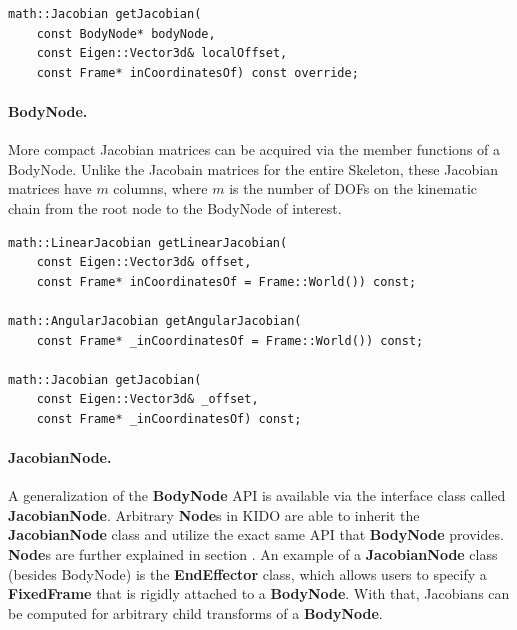 \begin{lstlisting}[caption=Skeleton.h]
math::Jacobian getJacobian(
    const BodyNode* bodyNode, 
    const Eigen::Vector3d& localOffset, 
    const Frame* inCoordinatesOf) const override;
\end{lstlisting}






\paragraph{BodyNode.} More compact Jacobian matrices can be acquired
via the member functions of a BodyNode. Unlike the Jacobain matrices
for the entire Skeleton, these Jacobian matrices have $m$ columns, where $m$ is the number of DOFs on the kinematic chain from the root node to the BodyNode of interest.


\begin{lstlisting}[caption=BodyNode.h]
math::LinearJacobian getLinearJacobian(
    const Eigen::Vector3d& offset, 
    const Frame* inCoordinatesOf = Frame::World()) const;

math::AngularJacobian getAngularJacobian(
    const Frame* _inCoordinatesOf = Frame::World()) const;

math::Jacobian getJacobian(
    const Eigen::Vector3d& _offset, 
    const Frame* _inCoordinatesOf) const;
\end{lstlisting}

\paragraph{JacobianNode.} A generalization of the \textbf{BodyNode} API is available via the interface class called \textbf{JacobianNode}. Arbitrary \textbf{Node}s in KIDO are able to inherit the \textbf{JacobianNode} class and utilize the exact same API that \textbf{BodyNode} provides. \textbf{Node}s are further explained in section \label{sec:nodes}. An example of a \textbf{JacobianNode} class (besides BodyNode) is the \textbf{EndEffector} class, which allows users to specify a \textbf{FixedFrame} that is rigidly attached to a \textbf{BodyNode}. With that, Jacobians can be computed for arbitrary child transforms of a \textbf{BodyNode}.

